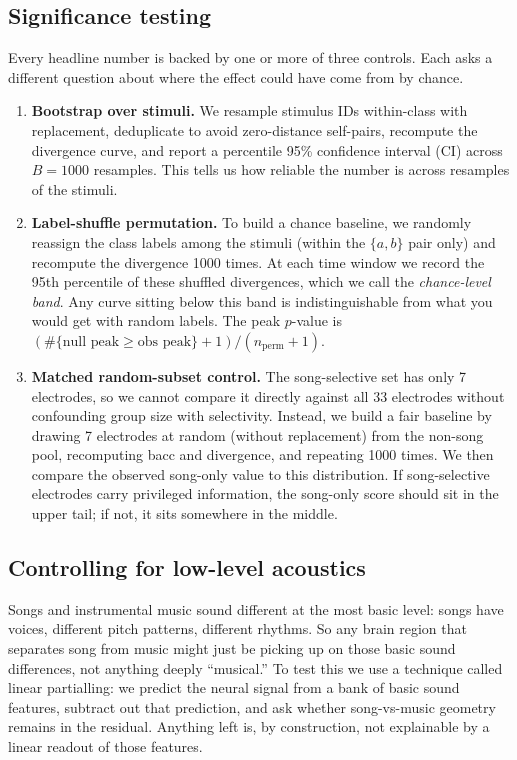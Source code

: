 \documentclass[11pt]{article}
\begin{document}
\subsection{Significance testing}
Every headline number is backed by one or more of three controls. Each asks a different question about where the effect could have come from by chance.
\begin{enumerate}
\setlength{\itemsep}{1pt}
    \item \textbf{Bootstrap over stimuli.} We resample stimulus IDs within-class with replacement, deduplicate to avoid zero-distance self-pairs, recompute the divergence curve, and report a percentile 95\% confidence interval (CI) across $B=1000$ resamples. This tells us how reliable the number is across resamples of the stimuli.
    \item \textbf{Label-shuffle permutation.} To build a chance baseline, we randomly reassign the class labels among the stimuli (within the $\{a,b\}$ pair only) and recompute the divergence 1000 times. At each time window we record the 95th percentile of these shuffled divergences, which we call the \emph{chance-level band}. Any curve sitting below this band is indistinguishable from what you would get with random labels. The peak $p$-value is $(\#\{\text{null peak} \geq \text{obs peak}\}+1)/(n_\text{perm}+1)$.
    \item \textbf{Matched random-subset control.} The song-selective set has only 7 electrodes, so we cannot compare it directly against all 33 electrodes without confounding group size with selectivity. Instead, we build a fair baseline by drawing 7 electrodes at random (without replacement) from the non-song pool, recomputing bacc and divergence, and repeating 1000 times. We then compare the observed song-only value to this distribution. If song-selective electrodes carry privileged information, the song-only score should sit in the upper tail; if not, it sits somewhere in the middle.
\end{enumerate}

\subsection{Controlling for low-level acoustics}\label{sec:methods:acoustic}
Songs and instrumental music sound different at the most basic level: songs have voices, different pitch patterns, different rhythms. So any brain region that separates song from music might just be picking up on those basic sound differences, not anything deeply ``musical.'' To test this we use a technique called linear partialling: we predict the neural signal from a bank of basic sound features, subtract out that prediction, and ask whether song-vs-music geometry remains in the residual. Anything left is, by construction, not explainable by a linear readout of those features.
\end{document}
